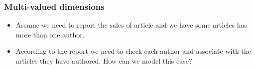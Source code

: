 \begin{frame}
	\frametitle{Multi-valued dimensions}
	\begin{example}
		\begin{itemize}[<+->]
			\item Assume we need to report the sales of article and we have some articles has more than one author.
			\item According to the report we need to check each author and associate with the articles they have authored. How can we model this case?
		\end{itemize}
	\end{example}

\end{frame}


\VideoClassification[column=1, colour=blue]

